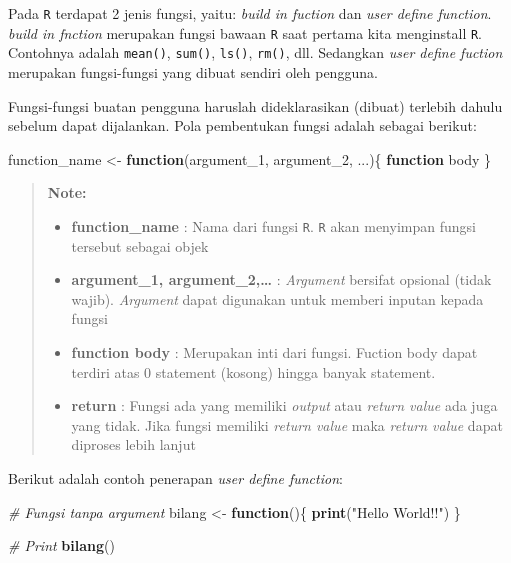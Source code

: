 \documentclass[]{book}
\newenvironment{Shaded}{\begin{snugshade}}{\end{snugshade}}
\newcommand{\KeywordTok}[1]{\textcolor[rgb]{0.13,0.29,0.53}{\textbf{#1}}}
\newcommand{\DecValTok}[1]{\textcolor[rgb]{0.00,0.00,0.81}{#1}}
\newcommand{\StringTok}[1]{\textcolor[rgb]{0.31,0.60,0.02}{#1}}
\newcommand{\CommentTok}[1]{\textcolor[rgb]{0.56,0.35,0.01}{\textit{#1}}}
\newcommand{\ControlFlowTok}[1]{\textcolor[rgb]{0.13,0.29,0.53}{\textbf{#1}}}
\newcommand{\NormalTok}[1]{#1}
\providecommand{\tightlist}{%
  \setlength{\itemsep}{0pt}\setlength{\parskip}{0pt}}
\begin{document}
Pada \texttt{R} terdapat 2 jenis fungsi, yaitu: \emph{build in fuction}
dan \emph{user define function}. \emph{build in fnction} merupakan
fungsi bawaan \texttt{R} saat pertama kita menginstall \texttt{R}.
Contohnya adalah \texttt{mean()}, \texttt{sum()}, \texttt{ls()},
\texttt{rm()}, dll. Sedangkan \emph{user define fuction} merupakan
fungsi-fungsi yang dibuat sendiri oleh pengguna.

Fungsi-fungsi buatan pengguna haruslah dideklarasikan (dibuat) terlebih
dahulu sebelum dapat dijalankan. Pola pembentukan fungsi adalah sebagai
berikut:

\begin{Shaded}
\begin{Highlighting}[]
\NormalTok{function_name <-}\StringTok{ }\ControlFlowTok{function}\NormalTok{(argument_}\DecValTok{1}\NormalTok{, argument_}\DecValTok{2}\NormalTok{, ...)\{}
  \ControlFlowTok{function}\NormalTok{ body}
\NormalTok{\}}
\end{Highlighting}
\end{Shaded}

\begin{quote}
\textbf{Note: }

\begin{itemize}
\tightlist
\item
  \textbf{function\_name} : Nama dari fungsi \texttt{R}. \texttt{R} akan
  menyimpan fungsi tersebut sebagai objek
\item
  \textbf{argument\_1, argument\_2,\ldots{}} : \emph{Argument} bersifat
  opsional (tidak wajib). \emph{Argument} dapat digunakan untuk memberi
  inputan kepada fungsi
\item
  \textbf{function body} : Merupakan inti dari fungsi. Fuction body
  dapat terdiri atas 0 statement (kosong) hingga banyak statement.
\item
  \textbf{return} : Fungsi ada yang memiliki \emph{output} atau
  \emph{return value} ada juga yang tidak. Jika fungsi memiliki
  \emph{return value} maka \emph{return value} dapat diproses lebih
  lanjut
\end{itemize}
\end{quote}

Berikut adalah contoh penerapan \emph{user define function}:

\begin{Shaded}
\begin{Highlighting}[]
\CommentTok{# Fungsi tanpa argument}
\NormalTok{bilang <-}\StringTok{ }\ControlFlowTok{function}\NormalTok{()\{}
  \KeywordTok{print}\NormalTok{(}\StringTok{"Hello World!!"}\NormalTok{)}
\NormalTok{\}}

\CommentTok{# Print}
\KeywordTok{bilang}\NormalTok{()}
\end{Highlighting}
\end{Shaded}
\end{document}
